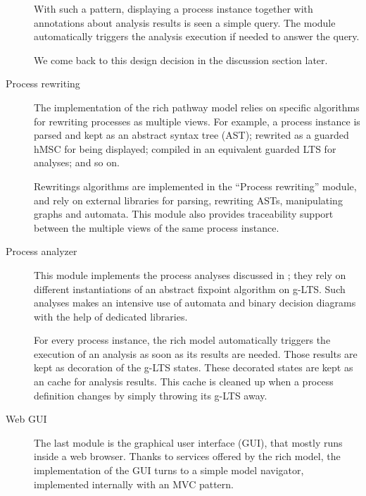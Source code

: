 \begin{description}
With such a pattern, displaying a process instance together with annotations about analysis results is seen a simple query. The module automatically triggers the analysis execution if needed to answer the query. 

We come back to this design decision in the discussion section later.

\item[Process rewriting] The implementation of the rich pathway model relies on specific algorithms for rewriting processes as multiple views. For example, a process instance is parsed and kept as an abstract syntax tree (AST); rewrited as a guarded hMSC for being displayed; compiled in an equivalent guarded LTS for analyses; and so on. 

Rewritings algorithms are implemented in the ``Process rewriting'' module, and rely on external libraries for parsing, rewriting ASTs, manipulating graphs and automata. This module also provides traceability support between the multiple views of the same process instance.

\item[Process analyzer] This module implements the process analyses discussed in \cite{Damas:2011}; they rely on different instantiations of an abstract fixpoint algorithm on g-LTS. Such analyses makes an intensive use of automata and binary decision diagrams with the help of dedicated libraries. 

For every process instance, the rich model automatically triggers the execution of an analysis as soon as its results are needed. Those results are kept as decoration of the g-LTS states. These decorated states are kept as an cache for analysis results. This cache is cleaned up when a process definition changes by simply throwing its g-LTS away.

\item[Web GUI] The last module is the graphical user interface (GUI), that mostly runs inside a web browser. Thanks to services offered by the rich model, the implementation of the GUI turns to a simple model navigator, implemented internally with an MVC pattern. 


\end{description}
